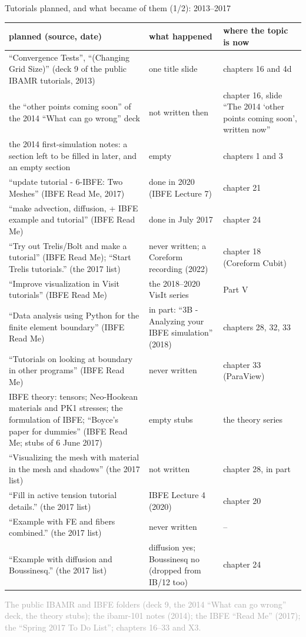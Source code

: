 \documentclass[aspectratio=169,11pt]{beamer}
\newcommand{\sourcecredit}[1]{\vfill\begin{flushright}\tiny\textcolor{DarkGray}{#1}\end{flushright}}
\begin{document}
\begin{frame}{Tutorials planned, and what became of them (1/2): 2013--2017}
\label{fr:planned1}
\tiny
\renewcommand{\arraystretch}{1.0}
\setlength{\tabcolsep}{3pt}
\begin{tabular}{@{}L{0.43\textwidth}L{0.27\textwidth}L{0.24\textwidth}@{}}
\toprule
planned (source, date) & what happened & where the topic is now \\
\midrule
``Convergence Tests'', ``(Changing Grid Size)'' (deck 9 of the public IBAMR tutorials, 2013) & one title slide & chapters 16 and 4d \\
the ``other points coming soon'' of the 2014 ``What can go wrong'' deck & not written then & chapter 16, slide ``The 2014 `other points coming soon', written now'' \\
the 2014 first-simulation notes: a section left to be filled in later, and an empty section & empty & chapters 1 and 3 \\
``update tutorial - 6-IBFE: Two Meshes'' (IBFE Read Me, 2017) & done in 2020 (IBFE Lecture 7) & chapter 21 \\
``make advection, diffusion, + IBFE example and tutorial'' (IBFE Read Me) & done in July 2017 & chapter 24 \\
``Try out Trelis/Bolt and make a tutorial'' (IBFE Read Me); ``Start Trelis tutorials.'' (the 2017 list) & never written; a Coreform recording (2022) & chapter 18 (Coreform Cubit) \\
``Improve visualization in Visit tutorials'' (IBFE Read Me) & the 2018--2020 VisIt series & Part V \\
``Data analysis using Python for the finite element boundary'' (IBFE Read Me) & in part: ``3B - Analyzing your IBFE simulation'' (2018) & chapters 28, 32, 33 \\
``Tutorials on looking at boundary in other programs'' (IBFE Read Me) & never written & chapter 33 (ParaView) \\
IBFE theory: tensors; Neo-Hookean materials and PK1 stresses; the formulation of IBFE; ``Boyce's paper for dummies'' (IBFE Read Me; stubs of 6 June 2017) & empty stubs & the theory series \\
``Visualizing the mesh with material in the mesh and shadows'' (the 2017 list) & not written & chapter 28, in part \\
``Fill in active tension tutorial details.'' (the 2017 list) & IBFE Lecture 4 (2020) & chapter 20 \\
``Example with FE and fibers combined.'' (the 2017 list) & never written & -- \\
``Example with diffusion and Boussinesq.'' (the 2017 list) & diffusion yes; Boussinesq no (dropped from IB/12 too) & chapter 24 \\
\bottomrule
\end{tabular}
\sourcecredit{The public IBAMR and IBFE folders (deck 9, the 2014 ``What can go wrong'' deck, the theory stubs); the ibamr-101 notes (2014); the IBFE ``Read Me'' (2017); the ``Spring 2017 To Do List''; chapters 16--33 and X3.}
\end{frame}
\end{document}
